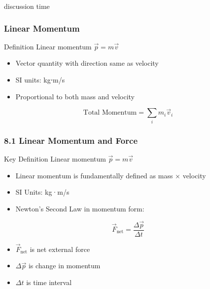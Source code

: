 \documentclass[aspectratio=169]{beamer}
\begin{document}
\begin{frame}{discussion time}
    
\end{frame}

\begin{frame}
\frametitle{Linear Momentum}
\begin{block}{Definition}
Linear momentum $\vec{p} = m\vec{v}$
\end{block}
\begin{itemize}
\item Vector quantity with direction same as velocity
\item SI units: kg⋅m/s
\item Proportional to both mass and velocity
\end{itemize}
\begin{equation*}
\text{Total Momentum} = \sum_i m_i\vec{v}_i
\end{equation*}
\end{frame}



\begin{frame}
\frametitle{8.1 Linear Momentum and Force}
\begin{block}{Key Definition}
Linear momentum $\vec{p} = m\vec{v}$
\end{block}

\begin{itemize}
\item Linear momentum is fundamentally defined as mass × velocity
\item SI Units: kg·m/s
\item Newton's Second Law in momentum form:
\end{itemize}

\begin{equation*}
\vec{F}_{\text{net}} = \frac{\Delta \vec{p}}{\Delta t}
\end{equation*}

\begin{itemize}
\item $\vec{F}_{\text{net}}$ is net external force
\item $\Delta \vec{p}$ is change in momentum
\item $\Delta t$ is time interval
\end{itemize}
\end{frame}
\end{document}
